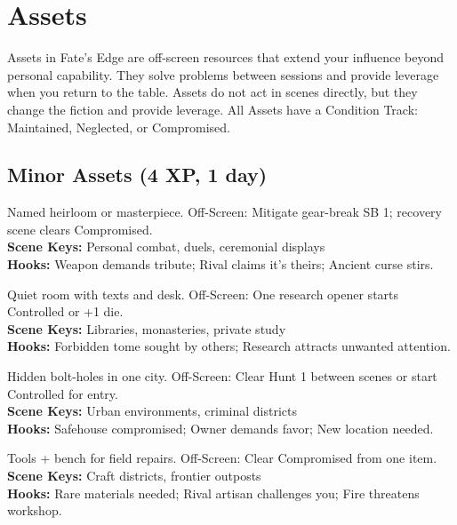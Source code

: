 \documentclass[12pt]{article}
\begin{document}
\section*{Assets}

Assets in Fate's Edge are off-screen resources that extend your influence beyond personal capability. They solve problems between sessions and provide leverage when you return to the table. Assets do not act in scenes directly, but they change the fiction and provide leverage. All Assets have a Condition Track: Maintained, Neglected, or Compromised.

\subsection*{Minor Assets (4 XP, 1 day)}

\begin{description}[leftmargin=*]
  \item[\textbf{Signature Weapon}] Named heirloom or masterpiece. Off-Screen: Mitigate gear-break SB 1; recovery scene clears Compromised. \\
  \textbf{Scene Keys:} Personal combat, duels, ceremonial displays \\
  \textbf{Hooks:} Weapon demands tribute; Rival claims it's theirs; Ancient curse stirs.

  \item[\textbf{Scholar's Cell}] Quiet room with texts and desk. Off-Screen: One research opener starts Controlled or +1 die. \\
  \textbf{Scene Keys:} Libraries, monasteries, private study \\
  \textbf{Hooks:} Forbidden tome sought by others; Research attracts unwanted attention.

  \item[\textbf{Safehouse Network}] Hidden bolt-holes in one city. Off-Screen: Clear Hunt 1 between scenes or start Controlled for entry. \\
  \textbf{Scene Keys:} Urban environments, criminal districts \\
  \textbf{Hooks:} Safehouse compromised; Owner demands favor; New location needed.

  \item[\textbf{Artisan's Workshop}] Tools + bench for field repairs. Off-Screen: Clear Compromised from one item. \\
  \textbf{Scene Keys:} Craft districts, frontier outposts \\
  \textbf{Hooks:} Rare materials needed; Rival artisan challenges you; Fire threatens workshop.


\end{description}
\end{document}
